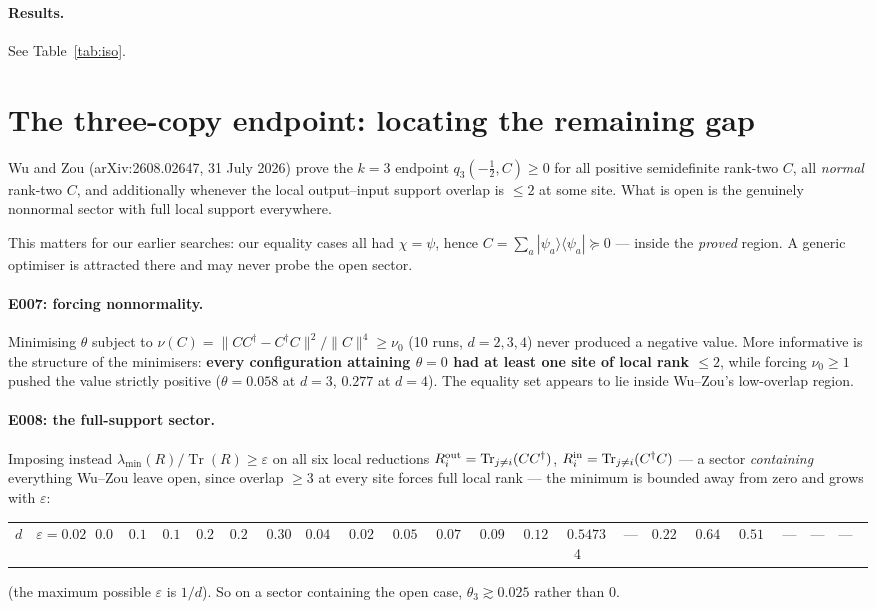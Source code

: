 \documentclass[11pt]{article}
\theoremstyle{definition}
\theoremstyle{plain}
\newcommand{\Tr}{\operatorname{Tr}}
\begin{document}
\paragraph{Results.} See Table~\ref{tab:iso}.

\section{The three-copy endpoint: locating the remaining gap}
\label{sec:k3gap}

Wu and Zou (arXiv:2608.02647, 31 July 2026) prove the $k=3$ endpoint
$q_3(-\tfrac12,C)\ge0$ for all positive semidefinite rank-two $C$, all \emph{normal}
rank-two $C$, and additionally whenever the local output--input support overlap is $\le2$
at some site. What is open is the genuinely nonnormal sector with full local support
everywhere.

This matters for our earlier searches: our equality cases all had $\chi=\psi$, hence
$C=\sum_a|\psi_a\rangle\langle\psi_a|\succeq0$ --- inside the \emph{proved} region. A
generic optimiser is attracted there and may never probe the open sector.

\paragraph{E007: forcing nonnormality.} Minimising $\theta$ subject to
$\nu(C)=\|CC^\dagger-C^\dagger C\|^2/\|C\|^4\ge\nu_0$ (10 runs, $d=2,3,4$) never produced a
negative value. More informative is the structure of the minimisers: \textbf{every
configuration attaining $\theta=0$ had at least one site of local rank $\le2$}, while
forcing $\nu_0\ge1$ pushed the value strictly positive ($\theta=0.058$ at $d=3$, $0.277$ at
$d=4$). The equality set appears to lie inside Wu--Zou's low-overlap region.

\paragraph{E008: the full-support sector.} Imposing instead
$\lambda_{\min}(R)/\Tr(R)\ge\varepsilon$ on all six local reductions
$R_i^{\rm out}=\Tr_{j\ne i}(CC^\dagger)$, $R_i^{\rm in}=\Tr_{j\ne i}(C^\dagger C)$ --- a
sector \emph{containing} everything Wu--Zou leave open, since overlap $\ge3$ at every site
forces full local rank --- the minimum is bounded away from zero and grows with
$\varepsilon$:
\begin{center}
{\setlength{\tabcolsep}{7pt}\renewcommand{\arraystretch}{1.2}
\begin{tabular}{rrrrrrrr}
\toprule
$d$ & $\varepsilon=0.02$ & $0.05$ & $0.10$ & $0.15$ & $0.20$ & $0.25$ & $0.30$ \
 & $0.0459$ & $0.0255$ & $0.0504$ & $0.0757$ & $0.0980$ & $0.1262$ & $0.5473$ \
4 & --- & $0.2291$ & $0.6444$ & $0.5173$ & --- & --- & --- \
\bottomrule
\end{tabular}}
\end{center}
(the maximum possible $\varepsilon$ is $1/d$). So on a sector containing the open case,
$\theta_3\gtrsim0.025$ rather than $0$.
\end{document}
